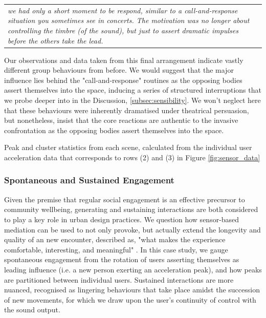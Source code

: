 \begin{center}
\begin{tabular}{ p{13cm}}
\textit{we had only a short moment to be respond, similar to a call-and-response situation you sometimes see in concerts. The motivation was no longer about controlling the timbre (of the sound), but just to assert dramatic impulses before the others take the lead.}
\end{tabular}
\end{center}
 
Our observations and data taken from this final arrangement indicate vastly different group behaviours from before. We would suggest that the major influence lies behind the "call-and-response" routines as the opposing bodies assert themselves into the space, inducing a series of structured interruptions that we probe deeper into in the Discussion, \ref{subsec:sensibility}. We won't neglect here that these behaviours were inherently dramatised under theatrical persuasion, but nonetheless, insist that the core reactions are authentic to the invasive confrontation as the opposing bodies assert themselves into the space.

\begin{table}[!h]

\caption[Peak and cluster statistics from each scene]{Peak and cluster statistics from each scene, calculated from the individual user acceleration data that corresponds to rows (2) and (3) in Figure \ref{fig:sensor_data}}
\label{table:cluster_table}
\end{table}

\subsubsection{Spontaneous and Sustained Engagement}

Given the premise that regular social engagement is an effective precursor to community wellbeing, generating and sustaining interactions are both considered to play a key role in urban design practices. We question how sensor-based mediation can be used to not only provoke, but actually extend the longevity and quality of an new encounter, described as, "what makes the experience comfortable, interesting, and meaningful" \citep{mehta_look_2009}. In this case study, we gauge spontaneous engagement from the rotation of users asserting themselves as leading influence (i.e. a new person exerting an acceleration peak), and how peaks are partitioned between individual users. Sustained interactions are more nuanced, recognised as lingering behaviours that take place amidst the succession of new movements, for which we draw upon the user's continuity of control with the sound output.

